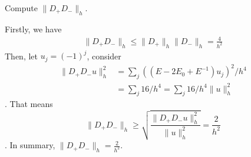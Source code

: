 \exc Compute $\lVert D_+ D_- \rVert_h$.

\begin{solution}
    Firstly, we have 
    \begin{align*}
        \lVert D_+ D_- \rVert_h \leq
         \lVert D_+ \rVert_h \lVert D_- \rVert_h
         = \frac{4}{h^2}
    \end{align*}
    Then, let $u_j = (-1)^j$, consider
    \begin{align*}
        \lVert D_+ D_- u \rVert_h^2 
        &= \sum_j ((E - 2E_0 + E^{-1})u_j)^2 / h^4 \\
        &= \sum_j 16/ h^4 = \sum_j 16/ h^4 \lVert u \rVert_h^2
    \end{align*}.
    That means 
    \[\lVert D_+ D_- \rVert_h \geq
     \sqrt{\frac{\lVert D_+ D_- u \rVert_h^2 }
     { \lVert u \rVert_h^2}} = \frac{2}{h^2} \].
    In summary, $\lVert D_+ D_- \rVert_h = \frac{2}{h^2}$. 
\end{solution}
